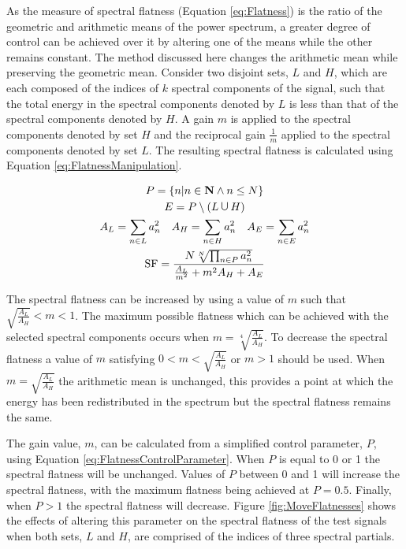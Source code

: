 		As the measure of spectral flatness (Equation \ref{eq:Flatness}) is the ratio of the geometric and
		arithmetic means of the power spectrum, a greater degree of control can be achieved over it by altering one
		of the means while the other remains constant. The method discussed here changes the arithmetic mean while
		preserving the geometric mean. Consider two disjoint sets, $L$ and $H$, which are each composed of the
		indices of $k$ spectral components of the signal, such that the total energy in the spectral components
		denoted by $L$ is less than that of the spectral components denoted by $H$. A gain $m$ is applied to the
		spectral components denoted by set $H$ and the reciprocal gain $\frac{1}{m}$ applied to the spectral
		components denoted by set $L$. The resulting spectral flatness is calculated using Equation
		\ref{eq:FlatnessManipulation}.

		\begin{gather}
			P = \left\{ n | n \in \textbf{N} \land n \leq N \right\} \nonumber \\
			E = P \setminus (L \medcup H) \nonumber \\
			A_{L} = \sum_{n \in L} a_{n}^{2} \quad A_{H} = \sum_{n \in H} a_{n}^{2}
			   \quad A_{E} = \sum_{n \in E} a_{n}^{2} \nonumber \\
			\mathrm{SF} = \frac{N\sqrt[N]{\prod_{n \in P} a_{n}^{2}}}
					   {\frac{A_{L}}{m^{2}} + m^{2}A_{H} + A_{E}}
			\label{eq:FlatnessManipulation}
		\end{gather}

		The spectral flatness can be increased by using a value of $m$ such that $\sqrt{\frac{A_{L}}{A_{H}}} < m <
		1$. The maximum possible flatness which can be achieved with the selected spectral components occurs when
		$m = \sqrt[4]{\frac{A_{L}}{A_{H}}}$. To decrease the spectral flatness a value of $m$ satisfying $0 < m <
		\sqrt{\frac{A_{L}}{A_{H}}}$ or $m > 1$ should be used. When $m = \sqrt{\frac{A_{L}}{A_{H}}}$ the arithmetic
		mean is unchanged, this provides a point at which the energy has been redistributed in the spectrum but the
		spectral flatness remains the same. 

		The gain value, $m$, can be calculated from a simplified control parameter, $P$, using Equation
		\ref{eq:FlatnessControlParameter}. When $P$ is equal to 0 or 1 the spectral flatness will be unchanged.
		Values of $P$ between 0 and 1 will increase the spectral flatness, with the maximum flatness being achieved
		at $P = 0.5$. Finally, when $P > 1$ the spectral flatness will decrease.  Figure \ref{fig:MoveFlatnesses}
		shows the effects of altering this parameter on the spectral flatness of the test signals when both sets,
		$L$ and $H$, are comprised of the indices of three spectral partials.

